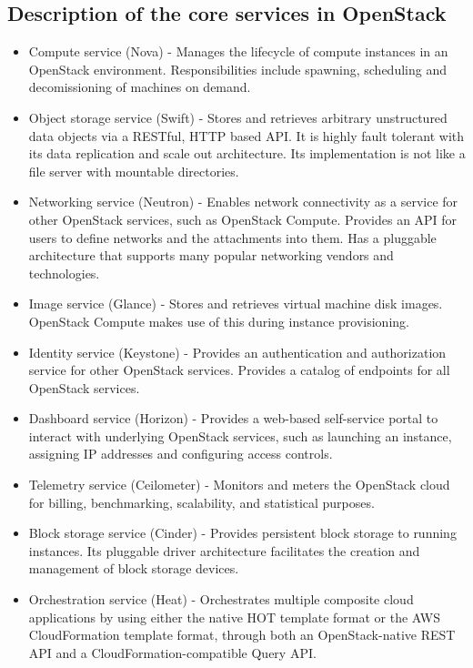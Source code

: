\subsection{Description of the core services in OpenStack}\label{ssec:openstackservices}
\begin{itemize}
  \item Compute service (Nova) - Manages the lifecycle of compute instances in an OpenStack environment. Responsibilities include spawning, scheduling and decomissioning of machines on demand.
  \item Object storage service (Swift) - Stores and retrieves arbitrary unstructured data objects via a RESTful, HTTP based API. It is highly fault tolerant with its data replication and scale out architecture. Its implementation is not like a file server with mountable directories.
  \item Networking service (Neutron) - Enables network connectivity as a service for other OpenStack services, such as OpenStack Compute. Provides an API for users to define networks and the attachments into them. Has a pluggable architecture that supports many popular networking vendors and technologies.
  \item Image service (Glance) - Stores and retrieves virtual machine disk images. OpenStack Compute makes use of this during instance provisioning.
  \item Identity service (Keystone) - Provides an authentication and authorization service for other OpenStack services. Provides a catalog of endpoints for all OpenStack services.
  \item Dashboard service (Horizon) - Provides a web-based self-service portal to interact with underlying OpenStack services, such as launching an instance, assigning IP addresses and configuring access controls.
  
  
  \item Telemetry service (Ceilometer) - Monitors and meters the OpenStack cloud for billing, benchmarking, scalability, and statistical purposes.
  \item Block storage service (Cinder) - Provides persistent block storage to running instances. Its pluggable driver architecture facilitates the creation and management of block storage devices.
  \item Orchestration service (Heat) - Orchestrates multiple composite cloud applications by using either the native HOT template format or the AWS CloudFormation template format, through both an OpenStack-native REST API and a CloudFormation-compatible Query API.
\end{itemize}

